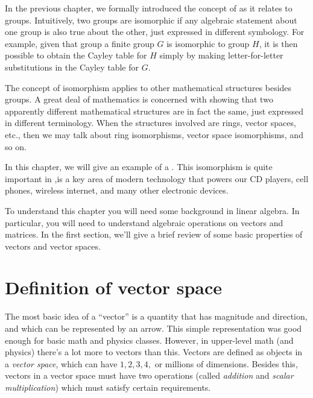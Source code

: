 
In the previous chapter, we formally introduced the concept of  as it relates to groups.
Intuitively, two groups are isomorphic if any algebraic statement about one group is also true about the other, just expressed in different symbology. For example, given that group a finite group $G$ is isomorphic to group $H$, it is then possible to obtain the Cayley table for $H$ simply by making letter-for-letter substitutions in the Cayley table for $G$.

The concept of isomorphism  applies to other mathematical structures besides groups. A great deal of mathematics is concerned with showing that two apparently different mathematical structures are in fact the same, just expressed in different terminology. When the structures involved are rings, vector spaces, etc., then we may talk about ring isomorphisms, vector space isomorphisms, and so on.

In this chapter, we will give an example of a . 
This isomorphism is quite important in  ,is a key area of modern technology that powers our CD players, cell phones, wireless internet, and many other electronic devices. 

To understand this chapter you will need some background in linear algebra. In particular, you will need to understand algebraic operations on vectors and matrices. In the first section, we'll give a brief review of some basic properties of vectors and vector spaces. 

\section{Definition of  vector space}
The most basic idea of a ``vector'' is  a quantity that has magnitude and direction, and which can be represented by an arrow. This simple representation was good enough for basic math and physics classes. However, in upper-level math (and physics) there's a lot more to vectors than this. Vectors are defined as objects in a \emph{vector space}, which can have $1,2,3, 4,$ or millions of dimensions. Besides this, vectors in a vector space must have two operations (called \emph{addition} and \emph{scalar multiplication}) which must satisfy certain requirements. 

